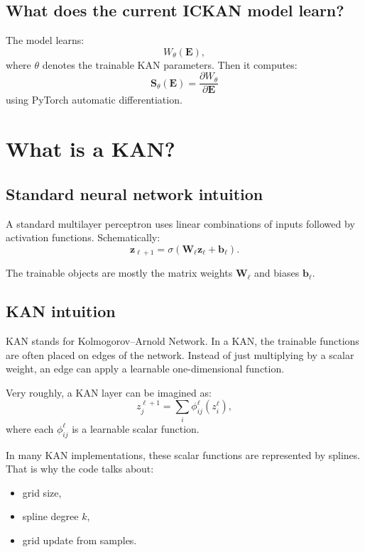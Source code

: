 \documentclass[11pt]{article}
\newcommand{\E}{\bm{E}}
\newcommand{\Sstress}{\bm{S}}
\begin{document}
\subsection{What does the current ICKAN model learn?}

The model learns:
\[
  W_{\theta}(\E),
\]
where $\theta$ denotes the trainable KAN parameters. Then it computes:
\[
  \Sstress_{\theta}(\E)
  =
  \frac{\partial W_{\theta}}{\partial \E}
\]
using PyTorch automatic differentiation.

\section{What is a KAN?}

\subsection{Standard neural network intuition}

A standard multilayer perceptron uses linear combinations of inputs followed by
activation functions. Schematically:
\[
  \bm{z}_{\ell+1}
  =
  \sigma(\bm{W}_{\ell}\bm{z}_{\ell}+\bm{b}_{\ell}).
\]

The trainable objects are mostly the matrix weights $\bm{W}_{\ell}$ and biases
$\bm{b}_{\ell}$.

\subsection{KAN intuition}

KAN stands for Kolmogorov--Arnold Network. In a KAN, the trainable functions are
often placed on edges of the network. Instead of just multiplying by a scalar
weight, an edge can apply a learnable one-dimensional function.

Very roughly, a KAN layer can be imagined as:
\[
  z_j^{\ell+1}
  =
  \sum_i \phi_{ij}^{\ell}(z_i^{\ell}),
\]
where each $\phi_{ij}^{\ell}$ is a learnable scalar function.

In many KAN implementations, these scalar functions are represented by splines.
That is why the code talks about:

\begin{itemize}[leftmargin=2em]
  \item grid size,
  \item spline degree $k$,
  \item grid update from samples.
\end{itemize}
\end{document}
